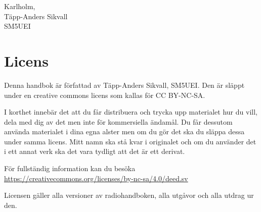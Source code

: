\noindent Karlholm, \DokumentDatum\\
Täpp-Anders Sikvall\\
	SM5UEI

\vspace{\fill}

\section*{Licens}

Denna handbok är författad av Täpp-Anders Sikvall, SM5UEI. Den är
släppt under en creative commons licens som kallas för CC BY-NC-SA.

I korthet innebär det att du får distribuera och trycka upp materialet
hur du vill, dela med dig av det men inte för kommersiella ändamål. Du
får dessutom använda materialet i dina egna alster men om du gör det
ska du släppa dessa under samma licens. Mitt namn ska stå kvar i
originalet och om du använder det i ett annat verk ska det vara
tydligt att det är ett derivat.

För fullständig information kan du besöka\\
\url{https://creativecommons.org/licenses/by-nc-sa/4.0/deed.sv}

Licensen gäller alla versioner av radiohandboken, alla utgåvor och
alla utdrag ur den.
